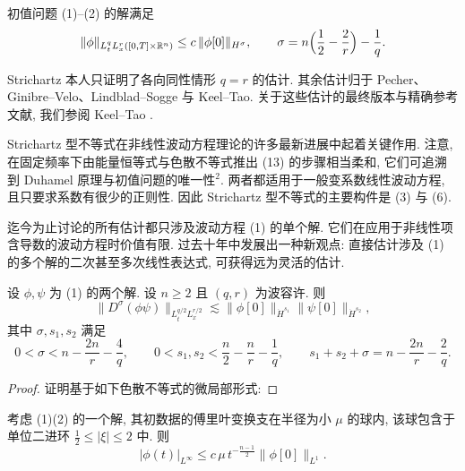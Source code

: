 \begin{proposition}\label{prop:1.11}
初值问题 (1)--(2) 的解满足
\[
\|\phi\|_{L_{t}^{q}L_{x}^{r}([0,T]\times\mathbb{R}^{n})}
\leq c\,\|\phi[0]\|_{H^{\sigma}},\qquad \sigma=n\Bigl(\frac{1}{2}-\frac{2}{r}\Bigr)-\frac{1}{q}.
\]
\end{proposition}

\begin{remark}\label{rem:1.12}
Strichartz 本人只证明了各向同性情形 $q = r$ 的估计. 其余估计归于 Pecher、Ginibre--Velo、Lindblad--Sogge 与 Keel--Tao. 关于这些估计的最终版本与精确参考文献, 我们参阅 Keel--Tao \cite{klai20}.\end{remark}

\begin{remark}\label{rem:1.13}
Strichartz 型不等式在非线性波动方程理论的许多最新进展中起着关键作用. 注意, 在固定频率下由能量恒等式与色散不等式推出 (13) 的步骤相当柔和, 它们可追溯到 Duhamel 原理与初值问题的唯一性$^{2}$. 两者都适用于一般变系数线性波动方程, 且只要求系数有很少的正则性. 因此 Strichartz 型不等式的主要构件是 (3) 与 (6).\end{remark}

迄今为止讨论的所有估计都只涉及波动方程 (1) 的单个解. 它们在应用于非线性项含导数的波动方程时价值有限. 过去十年中发展出一种新观点: 直接估计涉及 (1) 的多个解的二次甚至多次线性表达式, 可获得远为灵活的估计.
\begin{proposition}\label{prop:1.14}
设 $\phi, \psi$ 为 (1) 的两个解. 设 $n \geq 2$ 且 $(q, r)$ 为波容许. 则
\[
\|D^{\sigma}(\phi\psi)\|_{L_{t}^{q/2}L_{x}^{r/2}}\lesssim\|\phi[0]\|_{\dot{H}^{s_{1}}}\|\psi[0]\|_{\dot{H}^{s_{2}}},
\]
其中 $\sigma, s_{1}, s_{2}$ 满足
\[
0<\sigma<n-\frac{2n}{r}-\frac{4}{q},\qquad
0<s_{1},s_{2}<\frac{n}{2}-\frac{n}{r}-\frac{1}{q},\qquad
s_{1}+s_{2}+\sigma=n-\frac{2n}{r}-\frac{2}{q}.
\]
\end{proposition}

\begin{proof}
证明基于如下色散不等式的微局部形式:\end{proof}

\begin{proposition}\label{prop:1.15}
考虑 (1)(2) 的一个解, 其初数据的傅里叶变换支在半径为小 $\mu$ 的球内, 该球包含于单位二进环 $\frac{1}{2} \leq |\xi| \leq 2$ 中. 则
\[
|\phi(t)|_{L^{\infty}}\leq c\,\mu\, t^{-\frac{n-1}{2}}\|\phi[0]\|_{L^{1}}.
\]
\end{proposition}

